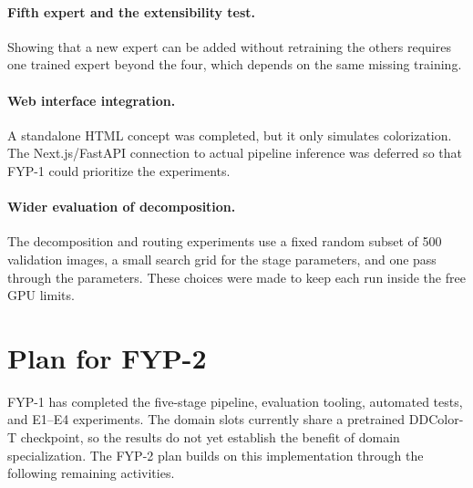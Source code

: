 \documentclass{FastFyp}
\begin{document}
\paragraph{Fifth expert and the extensibility test.} Showing that a new expert can be added without retraining the others requires one trained expert beyond the four, which depends on the same missing training.

\paragraph{Web interface integration.} A standalone HTML concept was completed, but it only simulates colorization. The Next.js/FastAPI connection to actual pipeline inference was deferred so that FYP-1 could prioritize the experiments.

\paragraph{Wider evaluation of decomposition.} The decomposition and routing experiments use a fixed random subset of 500 validation images, a small search grid for the stage parameters, and one pass through the parameters. These choices were made to keep each run inside the free GPU limits.



\section{Plan for FYP-2}
\label{sec:future-work}
FYP-1 has completed the five-stage pipeline, evaluation tooling, automated
tests, and E1--E4 experiments. The domain slots currently share a pretrained
DDColor-T checkpoint, so the results do not yet establish the benefit of
domain specialization. The FYP-2 plan builds on this implementation through
the following remaining activities.
\end{document}
